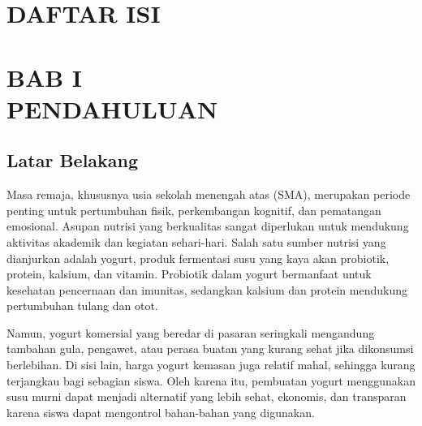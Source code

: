 \documentclass[a4paper,12pt, left=3cm,right=2cm,bottom=2cm, bahasa]{article}
\begin{document}
    \section*{DAFTAR ISI}
\renewcommand{\cftdot}{.}
\renewcommand{\contentsname}{}
\tableofcontents




\pagebreak
{}
\setcounter{page}{1}
\setcounter{section}{1}


\section*{BAB I \\PENDAHULUAN}
\subsection{Latar Belakang}
Masa remaja, khususnya usia sekolah menengah atas (SMA), merupakan periode penting untuk pertumbuhan fisik, perkembangan kognitif, dan pematangan emosional. Asupan nutrisi yang berkualitas sangat diperlukan untuk mendukung aktivitas akademik dan kegiatan sehari-hari. Salah satu sumber nutrisi yang dianjurkan adalah yogurt, produk fermentasi susu yang kaya akan probiotik, protein, kalsium, dan vitamin. Probiotik dalam yogurt bermanfaat untuk kesehatan pencernaan dan imunitas, sedangkan kalsium dan protein mendukung pertumbuhan tulang dan otot.

Namun, yogurt komersial yang beredar di pasaran seringkali mengandung tambahan gula, pengawet, atau perasa buatan yang kurang sehat jika dikonsumsi berlebihan. Di sisi lain, harga yogurt kemasan juga relatif mahal, sehingga kurang terjangkau bagi sebagian siswa. Oleh karena itu, pembuatan yogurt menggunakan susu murni dapat menjadi alternatif yang lebih sehat, ekonomis, dan transparan karena siswa dapat mengontrol bahan-bahan yang digunakan.
\end{document}
